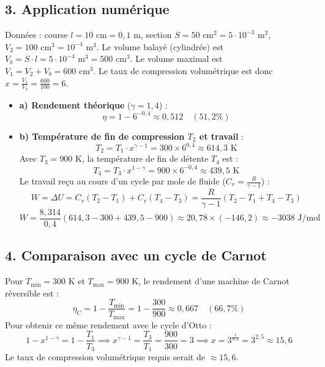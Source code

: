 \documentclass[a4paper,12pt]{article}
\begin{document}
 	\subsection*{3. Application numérique}
 	Données : course $l = 10\text{ cm} = 0,1\text{ m}$, section $S = 50\text{ cm}^2 = 5\cdot 10^{-3}\text{ m}^2$, $V_2 = 100\text{ cm}^3 = 10^{-4}\text{ m}^3$.
 	Le volume balayé (cylindrée) est $V_b = S \cdot l = 5\cdot 10^{-4}\text{ m}^3 = 500\text{ cm}^3$.
 	Le volume maximal est $V_1 = V_2 + V_b = 600\text{ cm}^3$.
 	Le taux de compression volumétrique est donc $x = \frac{V_1}{V_2} = \frac{600}{100} = 6$.
 	\begin{itemize}
 		\item \textbf{a) Rendement théorique} ($\gamma = 1,4$) :
 		\[ \eta = 1 - 6^{-0,4} \approx 0,512 \quad (51,2\%) \]
 		\item \textbf{b) Température de fin de compression $T_2$ et travail} :
 		\[ T_2 = T_1 \cdot x^{\gamma-1} = 300 \times 6^{0,4} \approx 614,3\text{ K} \]
 		Avec $T_3 = 900\text{ K}$, la température de fin de détente $T_4$ est :
 		\[ T_4 = T_3 \cdot x^{1-\gamma} = 900 \times 6^{-0,4} \approx 439,5\text{ K} \]
 		Le travail reçu au cours d'un cycle par mole de fluide ($C_v = \frac{R}{\gamma-1}$) :
 		\[ W = \Delta U = C_v(T_2 - T_1) + C_v(T_4 - T_3) = \frac{R}{\gamma-1} (T_2 - T_1 + T_4 - T_3) \]
 		\[ W = \frac{8,314}{0,4} (614,3 - 300 + 439,5 - 900) \approx 20,78 \times (-146,2) \approx -3038\text{ J/mol} \]
 	\end{itemize}
 	
 	\subsection*{4. Comparaison avec un cycle de Carnot}
 	Pour $T_{\text{min}} = 300\text{ K}$ et $T_{\text{max}} = 900\text{ K}$, le rendement d'une machine de Carnot réversible est :
 	\[ \eta_C = 1 - \frac{T_{\text{min}}}{T_{\text{max}}} = 1 - \frac{300}{900} \approx 0,667 \quad (66,7\%) \]
 	Pour obtenir ce même rendement avec le cycle d'Otto :
 	\[ 1 - x^{1-\gamma} = 1 - \frac{T_1}{T_3} \implies x^{\gamma-1} = \frac{T_3}{T_1} = \frac{900}{300} = 3 \implies x = 3^{\frac{1}{0,4}} = 3^{2,5} \approx 15,6 \]
 	Le taux de compression volumétrique requis serait de $\approx 15,6$.
 	
 
	 
 	
	
	
	
	
	
	
	
	
	
	
	
\end{document}
